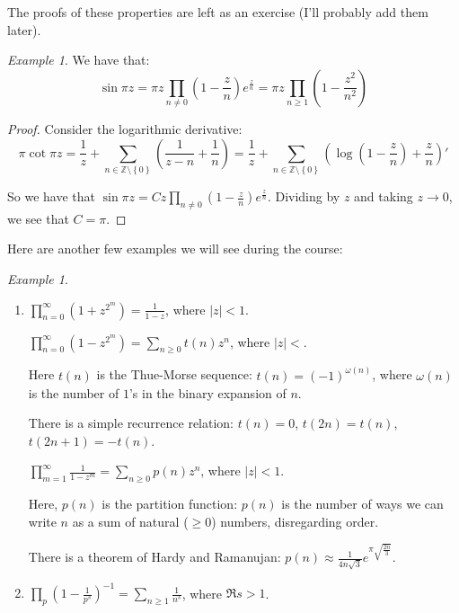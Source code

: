 \documentclass[11pt]{article} %
\theoremstyle{definition}
\theoremstyle{remark}
\newtheorem{example}[theorem]{Example}
\newcommand{\abs}[1]{\left|#1\right|}
\begin{document}
The proofs of these properties are left as an exercise (I'll probably add them later).

\begin{example}
We have that:
\[ \sin \pi z = \pi z \prod_{n\neq 0}\left(1 - \frac{z}{n}\right)e^{\frac{z}{n}} = \pi z \prod _{n\geq 1} \left(1 - \frac{z^2}{n^2}\right)\]
\end{example}

\begin{proof}
Consider the logarithmic derivative:
\[ \pi \cot \pi z = \frac{1}{z} + \sum _{n\in \mathbb{Z}\setminus\left\{0\right\}}\left(\frac{1}{z-n} + \frac{1}{n}\right) = \frac{1}{z} + \sum_{n\in \mathbb{Z}\setminus\left\{0\right\}} \left(\log \left(1- \frac{z}{n}\right) + \frac{z}{n}\right)'\]

So we have that $\sin \pi z = C z \prod_{n\neq 0}\left(1 - \frac{z}{n}\right)e^{\frac{z}{n}}$. Dividing by $z$ and taking $z \to 0$, we see that $C = \pi$.
\end{proof}

Here are another few examples we will see during the course:

\begin{example}
\begin{enumerate}
\item $\prod_{n=0}^\infty \left(1 + z^{2^m}\right) = \frac{1}{1-z}$, where $\abs{z} < 1$.
\begin{item}
$\prod_{n=0}^\infty \left(1 - z^{2^m}\right) = \sum_{n\geq 0} t\left(n\right) z^n$, where $\abs{z} < $.

Here $t\left(n\right)$ is the Thue-Morse sequence: $t\left(n\right) = \left(-1\right)^{\omega\left(n\right)}$, where $\omega\left(n\right)$ is the number of $1$'s in the binary expansion of $n$.

There is a simple recurrence relation: $t\left(n\right) = 0$, $t\left(2n\right) = t\left(n\right)$, $t\left(2n+1\right) = -t\left(n\right)$.
\end{item}

\begin{item}
$\prod_{m=1}^\infty \frac{1}{1- z^m} = \sum_{n \geq 0}p\left(n\right)z^n$, where $\abs{z} < 1$.

Here, $p\left(n\right)$ is the partition function: $p\left(n\right)$ is the number of ways we can write $n$ as a sum of natural ($\geq 0$) numbers, disregarding order.

There is a theorem of Hardy and Ramanujan: $p\left(n\right) \approx \frac{1}{4n\sqrt{3}} e^{\pi\sqrt{\frac{2n}{3}}}$.
\end{item}

\item $\prod_p \left(1-\frac{1}{p^s}\right)^{-1} = \sum_{n \geq 1} \frac{1}{n^s}$, where $\Re s > 1$.
\end{enumerate}
\end{example}
\end{document}
